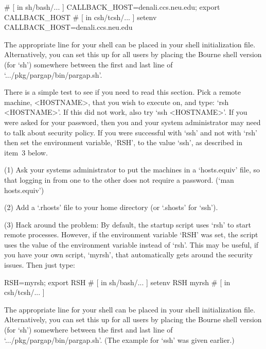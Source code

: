 \begintt
# [ in sh/bash/... ]
CALLBACK_HOST=denali.ccs.neu.edu; export CALLBACK_HOST
# [ in csh/tcsh/... ]
setenv CALLBACK_HOST=denali.ccs.neu.edu
\endtt

The appropriate  line  for  your  shell  can  be  placed  in  your  shell
initialization file. Alternatively, you can set this up for all users  by
placing the Bourne shell version (for `sh') somewhere between  the  first
and last line of `.../pkg/pargap/bin/pargap.sh'.


There is a simple test to see if you need to read this  section.  Pick  a
remote machine, <HOSTNAME>, that you wish to execute on, and  type:  `rsh
<HOSTNAME>'. If this did not work, also try `ssh <HOSTNAME>'. If you were
asked for your password, then you and your system administrator may  need
to talk about security policy. If you were successful with `ssh' and  not
with `rsh' then set the environment variable, `RSH', to the value  `ssh',
as described in item~3 below.

\beginlist
\item{(1)}
    Ask your systems administrator to put the machines in a `hosts.equiv'
    file, so that logging in from one to the other  does  not  require  a
    password. (`man hosts.equiv')

\item{(2)}
    Add a `.rhosts' file to your home directory (or `.shosts' for `ssh').

\item{(3)}
    Hack around the problem: By default, the startup script uses `rsh' to
    start remote processes. However, if the  environment  variable  `RSH'
    was set, the script  uses  the  value  of  the  environment  variable
    instead of `rsh'. This may be useful, if you have  your  own  script,
    `myrsh', that automatically gets around  the  security  issues.  Then
    just type:

\begintt
RSH=myrsh; export RSH  # [ in sh/bash/... ]
setenv RSH myrsh       # [ in csh/tcsh/... ]
\endtt

\item{}
    The appropriate line for your shell  can  be  placed  in  your  shell
    initialization file. Alternatively, you can set this up for all users
    by placing the Bourne shell version (for `sh') somewhere between  the
    first and last line of `.../pkg/pargap/bin/pargap.sh'.  (The  example
    for `ssh' was given earlier.)

